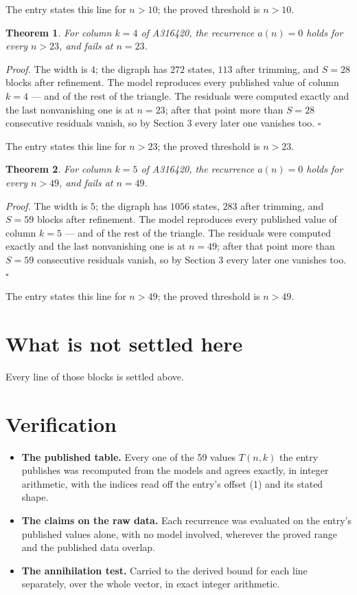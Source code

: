 \documentclass[11pt]{article}
\newtheorem{theorem}{Theorem}
\theoremstyle{definition}
\begin{document}
The entry states this line for $n > 10$; the proved threshold is $n > 10$.

\begin{theorem} For column $k = 4$ of A316420, the recurrence $a(n) = 0$ holds for every $n > 23$, and fails at $n = 23$.\end{theorem}

{\itshape Proof.} The width is $4$; the digraph has $272$ states, $113$ after trimming, and $S = 28$ blocks after refinement. The model reproduces every published value of column $k = 4$ --- and of the rest of the triangle. The residuals were computed exactly and the last nonvanishing one is at $n = 23$; after that point more than $S = 28$ consecutive residuals vanish, so by Section 3 every later one vanishes too. $\square$

The entry states this line for $n > 23$; the proved threshold is $n > 23$.

\begin{theorem} For column $k = 5$ of A316420, the recurrence $a(n) = 0$ holds for every $n > 49$, and fails at $n = 49$.\end{theorem}

{\itshape Proof.} The width is $5$; the digraph has $1056$ states, $283$ after trimming, and $S = 59$ blocks after refinement. The model reproduces every published value of column $k = 5$ --- and of the rest of the triangle. The residuals were computed exactly and the last nonvanishing one is at $n = 49$; after that point more than $S = 59$ consecutive residuals vanish, so by Section 3 every later one vanishes too. $\square$

The entry states this line for $n > 49$; the proved threshold is $n > 49$.

\section{What is not settled here}

Every line of those blocks is settled above.

\section{Verification}

\begin{itemize}

\item {\bfseries The published table.} Every one of the 59 values $T(n,k)$ the entry publishes was recomputed from the models and agrees exactly, in integer arithmetic, with the indices read off the entry's offset (1) and its stated shape.

\item {\bfseries The claims on the raw data.} Each recurrence was evaluated on the entry's published values alone, with no model involved, wherever the proved range and the published data overlap.

\item {\bfseries The annihilation test.} Carried to the derived bound for each line separately, over the whole vector, in exact integer arithmetic.

\end{itemize}
\end{document}
